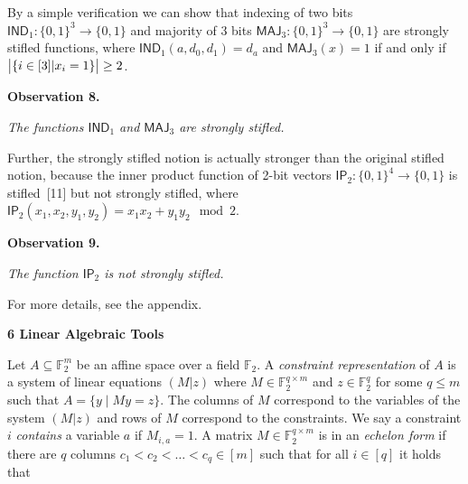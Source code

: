 \documentclass[10pt,a4paper]{article}
\begin{document}
By a simple verification we can show that indexing of two bits $\mathsf{IND}_{1}:\{0,1\}^{3}\to\{0,1\}$ and majority of 3 bits $\mathsf{MAJ}_{3}:\{0,1\}^{3}\to\{0,1\}$ are strongly stifled functions,
where $\mathsf{IND}_{1}(a,d_{0},d_{1})=d_{a}$ and $\mathsf{MAJ}_{3}(x)=1$ if and only if $\bigl{|}\{i\in[3]|x_{i}=1\}\bigr{|}\geq 2$.\par





\par\medskip\noindent\textbf{
\textbf{Observation 8}\textbf{.}
}\par



\emph{The functions $\mathsf{IND}_{1}$ and $\mathsf{MAJ}_{3}$ are strongly stifled.}\par






Further, the strongly stifled notion is actually stronger than the original stifled notion, because the inner product function of 2-bit vectors $\mathsf{IP}_{2}:\{0,1\}^{4}\to\{0,1\}$ is stifled [11] but not strongly stifled, where $\mathsf{IP}_{2}(x_{1},x_{2},y_{1},y_{2})=x_{1}x_{2}+y_{1}y_{2}\mod 2$.\par





\par\medskip\noindent\textbf{
\textbf{Observation 9}\textbf{.}
}\par



\emph{The function $\mathsf{IP}_{2}$ is not strongly stifled.}\par






For more details, see the appendix.\par





\par\medskip\noindent\textbf{
6 Linear Algebraic Tools}\par




Let $A\subseteq\mathbb{F}_{2}^{m}$ be an affine space over a field $\mathbb{F}_{2}$.
A \emph{constraint representation} of $A$ is a system of linear equations $(M|z)$ where $M\in\mathbb{F}_{2}^{q\times m}$ and $z\in\mathbb{F}_{2}^{q}$ for some $q\leq m$ such that $A=\{y\mid My=z\}$.
The columns of $M$ correspond to the variables of the system $(M|z)$ and rows of $M$ correspond to the constraints.
We say a constraint $i$ \emph{contains} a variable $a$ if $M_{i,a}=1$.
A matrix $M\in\mathbb{F}_{2}^{q\times m}$ is in an \emph{echelon form} if there are $q$ columns $c_{1}<c_{2}<\dots<c_{q}\in[m]$ such that for all $i\in[q]$ it holds that\par
\end{document}
